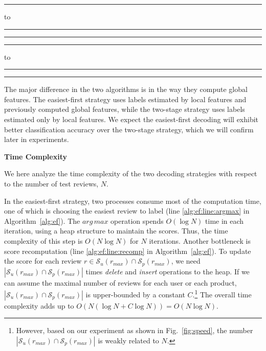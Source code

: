 \documentclass[english]{jnlp_1.4}
\newenvironment{algorithmX}{}{}
\newlength{\AlgoWd}\settowidth{\AlgoWd}{\small\textbf{Algorithm~0}\hskip1zw}
\begin{document}
\begin{algorithmX}[t]
\begin{minipage}[t]{232pt}
\newlength{\AlgoCapWd}\setlength{\AlgoCapWd}{232pt}\addtolength{\AlgoCapWd}{-\AlgoWd}
{\hrule height1pt}
    \caption{\hbox to}
    \label{alg:ef}
\vspace{2pt}
{\hrule height0.25pt}

{\hrule height0.25pt}
\end{minipage}
\hfill
\begin{minipage}[t]{178pt}
\setlength{\AlgoCapWd}{178pt}\addtolength{\AlgoCapWd}{-\AlgoWd}
{\hrule height1pt}
    \caption{\hbox to}
    \label{alg:ts}
\vspace{2pt}
{\hrule height0.25pt}

{\hrule height0.25pt}
\end{minipage}
\end{algorithmX}

The major difference in the two algorithms is in the way they compute global features. 
The easiest-first strategy uses labels estimated by local features and previously computed global features, while the two-stage strategy uses labels estimated only by local features. 
We expect the easiest-first decoding will exhibit better classification accuracy over the two-stage strategy, which we will confirm later in experiments. 


\noindent
\textbf{Time Complexity}

We here analyze the time complexity of the two decoding strategies with respect to the number of test reviews, $N$.

In the easiest-first strategy, two processes consume most of the computation time, 
one of which is choosing the easiest review to label (line \ref{alg:ef:line:argmax} in Algorithm~\ref{alg:ef}).  
The $arg\,max$ operation spends $O(\log{N})$ time in each iteration, using a heap structure to maintain the scores. 
Thus, the time complexity of this step is $O(N\log{N})$ for $N$ iterations. 
Another bottleneck is score recomputation (line \ref{alg:ef:line:recomp} in Algorithm~\ref{alg:ef}). 
To update the score for each review $r\in \mathcal{S}_u(r_{max})\cap \mathcal{S}_p(r_{max})$, we need $|\mathcal{S}_u(r_{max})\cap \mathcal{S}_p(r_{max})|$ times {\em delete} and {\em insert} operations to the heap. 
If we can assume the maximal number of reviews for each user or each product, $|\mathcal{S}_u(r_{max})\cap \mathcal{S}_p(r_{max})|$ is upper-bounded by a constant $C$.\footnote{However, based on our experiment as shown in Fig.~\ref{fig:speed}, the number $|\mathcal{S}_u(r_{max})\cap \mathcal{S}_p(r_{max})|$ is weakly related to $N$.} 
The overall time complexity adds up to $O(N(\log{N}+C\log{N}))=O(N\log{N})$.
\end{document}
